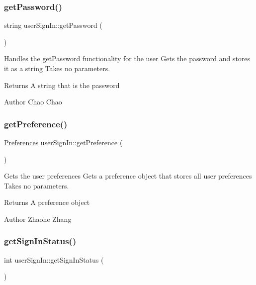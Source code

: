 \subsubsection{\texorpdfstring{get\+Password()}{getPassword()}}
{\footnotesize\ttfamily string user\+Sign\+In\+::get\+Password (\begin{DoxyParamCaption}{ }\end{DoxyParamCaption})}



Handles the get\+Password functionality for the user  Gets the password and stores it as a string  Takes no parameters. 

\begin{DoxyReturn}{Returns}
A string that is the password 
\end{DoxyReturn}
\begin{DoxyAuthor}{Author}
Chao Chao 
\end{DoxyAuthor}
\mbox{\label{classuser_sign_in_aaaa506b746cbef56014006a673b239d7}} 
\subsubsection{\texorpdfstring{get\+Preference()}{getPreference()}}
{\footnotesize\ttfamily \mbox{\hyperlink{class_preferences}{Preferences}} user\+Sign\+In\+::get\+Preference (\begin{DoxyParamCaption}{ }\end{DoxyParamCaption})}



Gets the user preferences  Gets a preference object that stores all user preferences  Takes no parameters. 

\begin{DoxyReturn}{Returns}
A preference object 
\end{DoxyReturn}
\begin{DoxyAuthor}{Author}
Zhaohe Zhang 
\end{DoxyAuthor}
\mbox{\label{classuser_sign_in_a7d75bf1b3bb7dcaa50e4f633050b7081}} 
\subsubsection{\texorpdfstring{get\+Sign\+In\+Status()}{getSignInStatus()}}
{\footnotesize\ttfamily int user\+Sign\+In\+::get\+Sign\+In\+Status (\begin{DoxyParamCaption}{ }\end{DoxyParamCaption})}



